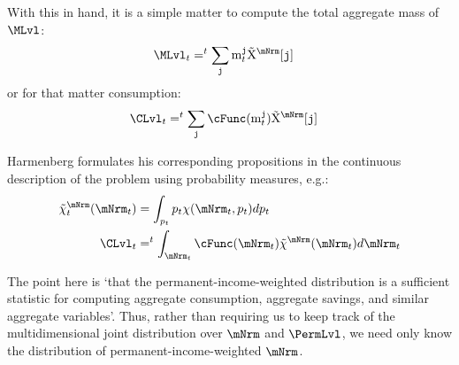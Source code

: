 \documentclass[\econtexRoot/BufferStockTheory]{subfiles}
\begin{document}
With this in hand, it is a simple matter to compute the total aggregate mass of $\MLvl$:
\begin{equation}\begin{gathered}\begin{aligned}
  \MLvl_{t} & = \PermGroFac^{t} \sum_{\nmNrmVecNow} \mNrmVecNow \mpMatMargWgt[\nmNrmVecNow]
\end{aligned}\end{gathered}\end{equation}
or for that matter consumption:
\begin{equation}\begin{gathered}\begin{aligned}
  \CLvl_{t} & = \PermGroFac^{t} \sum_{\nmNrmVecNow} \cFunc(\mNrmVecNow) \mpMatMargWgt[\nmNrmVecNow]
\end{aligned}\end{gathered}\end{equation}

Harmenberg formulates his corresponding propositions in the continuous description of the problem using probability measures, e.g.:
\begin{equation}\begin{gathered}\begin{aligned}
  \mpPrbMargWgt_{t}(\mNrmNow) & = \int_{\PermLvlNow} \PermLvlNow \mpPrb(\mNrmNow,\PermLvlNow) d \PermLvlNow
\\ \CLvl_{t} & = \PermGroFac^{t} \int_{\mNrmNow} \cFunc(\mNrmNow) \mpPrbMargWgt(\mNrmNow)                             d \mNrmNow
\end{aligned}\end{gathered}\end{equation}

The point here is `that the permanent-income-weighted distribution is a sufficient statistic for computing aggregate consumption, aggregate savings, and similar aggregate variables'.  Thus, rather than requiring us to keep track of the multidimensional joint distribution over $\mNrm$ and $\PermLvl$, we need only know the distribution of permanent-income-weighted $\mNrm$.
\end{document}
